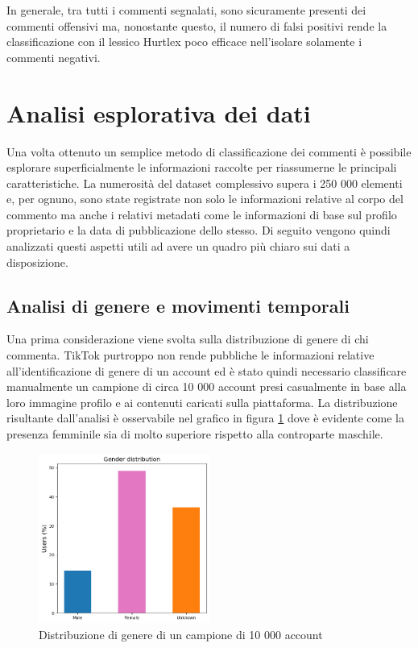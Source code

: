    In generale, tra tutti i commenti segnalati, sono sicuramente presenti dei commenti offensivi ma, nonostante questo, il numero di falsi positivi rende la classificazione con il lessico Hurtlex poco efficace nell'isolare solamente i commenti negativi.
    




\section{Analisi esplorativa dei dati}
Una volta ottenuto un semplice metodo di classificazione dei commenti è possibile esplorare superficialmente le informazioni raccolte per riassumerne le principali caratteristiche. La numerosità del dataset complessivo supera i 250 000 elementi e, per ognuno, sono state registrate non solo le informazioni relative al corpo del commento ma anche i relativi metadati come le informazioni di base sul profilo proprietario e la data di pubblicazione dello stesso. Di seguito vengono quindi analizzati questi aspetti utili ad avere un quadro più chiaro sui dati a disposizione.

\subsection{Analisi di genere e movimenti temporali}
    
    Una prima considerazione viene svolta sulla distribuzione di genere di chi commenta. TikTok purtroppo non rende pubbliche le informazioni relative all'identificazione di genere di un account ed è stato quindi necessario classificare manualmente un campione di circa 10 000 account presi casualmente in base alla loro immagine profilo e ai contenuti caricati sulla piattaforma. La distribuzione risultante dall'analisi è osservabile nel grafico in figura \ref{fig:gendere distribution} dove è evidente come la presenza femminile sia di molto superiore rispetto alla controparte maschile.
    
    \begin{figure}[h]
        \centering
        \includegraphics[width=0.5\textwidth]{pics/gender-distribution.png}
        \caption{Distribuzione di genere di un campione di 10 000 account}
        \label{fig:gendere distribution}
    \end{figure}
    
